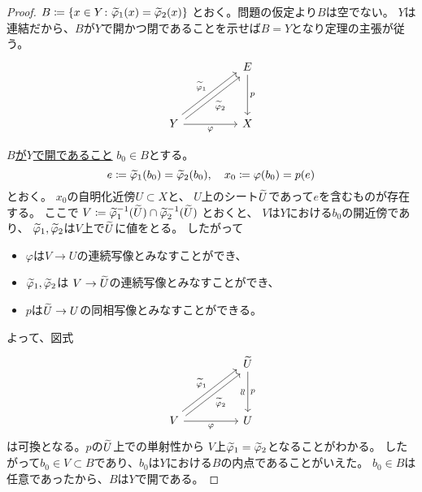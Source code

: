 \documentclass[report]{jlreq}
\begin{document}
\begin{proof}
    $B \coloneqq \{ x \in Y \colon \widetilde{\varphi}_1(x) = \widetilde{\varphi}_2(x) \}$
    とおく。問題の仮定より$B$は空でない。
    $Y$は連結だから、$B$が$Y$で開かつ閉であることを示せば$B = Y$となり定理の主張が従う。
    \begin{equation}
        \begin{tikzcd}[row sep=huge, column sep=huge]
            & E \ar[d, "{p}"] \\
            Y \ar[ur, shift left, "{\wt{\varphi}_1}"]
                \ar[ur, shift right, "{\wt{\varphi}_2}"'] \ar[r, "{\varphi}"'] & X
        \end{tikzcd}
    \end{equation}

    \noindent
    \uline{$B$が$Y$で開であること} \quad
    $b_0 \in B$とする。
    \begin{equation}
        e \coloneqq \widetilde{\varphi}_1(b_0) = \widetilde{\varphi}_2(b_0),
        \quad
        x_0 \coloneqq \varphi(b_0) = p(e)
    \end{equation}
    とおく。
    $x_0$の自明化近傍$U \subset X$と、
    $U$上のシート$\widetilde{U}$であって$e$を含むものが存在する。
    ここで
    $V \coloneqq \widetilde{\varphi}_1^{-1}(\widetilde{U})
        \cap \widetilde{\varphi}_2^{-1}(\widetilde{U})$
    とおくと、
    $V$は$Y$における$b_0$の開近傍であり、
    $\widetilde{\varphi}_1, \widetilde{\varphi}_2$は$V$上で$\widetilde{U}$に値をとる。
    したがって
    \begin{itemize}
        \item $\varphi$は$V \to U$の連続写像とみなすことができ、
        \item $\widetilde{\varphi}_1, \widetilde{\varphi}_2$は
            $V \to \widetilde{U}$の連続写像とみなすことができ、
        \item $p$は$\widetilde{U} \to U$の同相写像とみなすことができる。
    \end{itemize}
    よって、図式
    \begin{equation}
        \begin{tikzcd}[row sep=huge, column sep=huge]
            & \wt{U} \ar{d}{p}[swap, anchor=center, rotate=90, yshift=1ex]{\approx} \\
            V \ar[shift left]{ur}{\wt{\varphi}_1}
                \ar[shift right]{ur}[swap]{\wt{\varphi}_2}
                \ar[r, "{\varphi}"']
                & U
        \end{tikzcd}
    \end{equation}
    は可換となる。$p$の$\widetilde{U}$上での単射性から
    $V$上$\widetilde{\varphi}_1 = \widetilde{\varphi}_2$となることがわかる。
    したがって$b_0 \in V \subset B$であり、$b_0$は$Y$における$B$の内点であることがいえた。
    $b_0 \in B$は任意であったから、$B$は$Y$で開である。


\end{proof}
\end{document}
